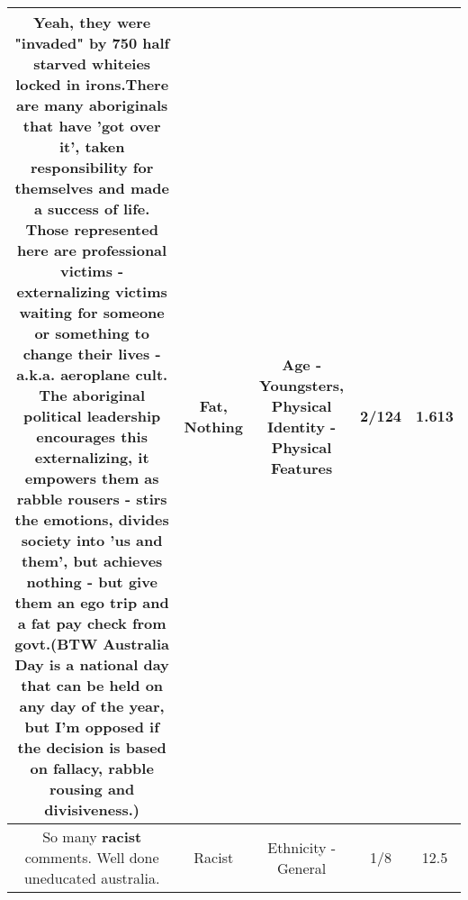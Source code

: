 \documentclass[11pt]{article}
\newlength\mylength
\begin{document}
\begin{center}
\begin{longtable}{|C{.65\mylength}|C{.30\mylength}|C{.12\mylength}|C{.12\mylength}|C{.12\mylength}|}
  \small Yeah, they were "invaded" by 750 half starved whiteies locked in irons.There are many aboriginals that have 'got over it', taken responsibility for themselves and made a success of life. Those represented here are professional victims - externalizing victims waiting for someone or something to change their lives - a.k.a. aeroplane cult. The aboriginal political leadership encourages this externalizing, it empowers them as rabble rousers - stirs the emotions, divides society into 'us and them', but achieves \textbf{nothing} - but give them an ego trip and a \textbf{fat} pay check from govt.(BTW Australia Day is a national day that can be held on any day of the year, but I'm opposed if the decision is based on fallacy, rabble rousing and divisiveness.)\normalsize   & Fat, Nothing & Age - Youngsters, Physical Identity - Physical Features & 2/124 & 1.613 \\  \hline
  \small So many \textbf{racist} comments. Well done uneducated australia.\normalsize   & Racist & Ethnicity - General & 1/8 & 12.5 \\  \hline

\end{longtable}
\end{center}
\end{document}
